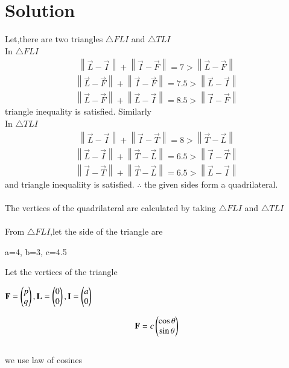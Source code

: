 \documentclass[journal,12pt,twocolumn]{IEEEtran}
\newcommand{\norm}[1]{\left\lVert#1\right\rVert}
\begin{document}
\section{Solution}
Let,there are two triangles $\triangle FLI$ and $\triangle TLI$\\
In $\triangle FLI$
\begin{align}
  \norm{\vec{L}-\vec{I}}+\norm{\vec{I}-\vec{F}}=7 > \norm{\vec{L}-\vec{F}}
\end{align}
\begin{align}
   \norm{\vec{L}-\vec{F}}+\norm{\vec{I}-\vec{F}}=7.5 > \norm{\vec{L}-\vec{I}} 
\end{align}
\begin{align}
    \norm{\vec{L}-\vec{F}}+\norm{\vec{L}-\vec{I}}=8.5 > \norm{\vec{I}-\vec{F}}
\end{align}
triangle inequality is satisfied. Similarly \\
In $\triangle TLI$
\begin{align}
  \norm{\vec{L}-\vec{I}}+\norm{\vec{I}-\vec{T}}=8 > \norm{\vec{T}-\vec{L}}
\end{align}
\begin{align}
   \norm{\vec{L}-\vec{I}}+\norm{\vec{T}-\vec{L}}=6.5 > \norm{\vec{I}-\vec{T}} 
\end{align}
\begin{align}
   \norm{\vec{I}-\vec{T}}+\norm{\vec{T}-\vec{L}}=6.5 > \norm{\vec{L}-\vec{I}} 
\end{align}
and triangle inequaliity is satisfied.
$\therefore$ the given sides form a quadrilateral.\\
\\The vertices of the quadrilateral are calculated by taking $\triangle FLI$ and $\triangle TLI$\\
\\From $\triangle FLI$,let the side of the triangle are
\begin{center}
   a=4, b=3, c=4.5 
\end{center}
Let the vertices of the triangle 
\begin{center}
   $\mathbf{F}=\begin{pmatrix}p\\q\end{pmatrix}, \mathbf{L}=\begin{pmatrix}0\\0\end{pmatrix}, \mathbf{I}=\begin{pmatrix}a\\0\end{pmatrix}$ 
\end{center}
\begin{align}
    \mathbf{F}=c\begin{pmatrix}\cos \theta\\\sin \theta\end{pmatrix}
\end{align}
\\ we use law of cosines
\end{document}
